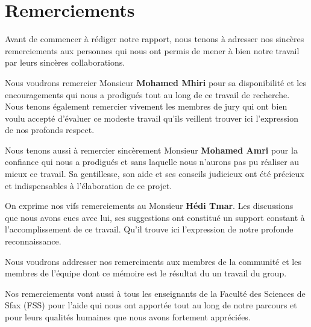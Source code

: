 \section*{Remerciements}

\vspace{0.9in}
\begin{center}

    Avant de commencer à rédiger notre rapport, nous tenons à adresser nos
    sincères remerciements aux personnes qui nous ont permis de mener à bien
    notre travail par leurs sincères collaborations.

    Nous voudrons remercier Monsieur \textbf{Mohamed Mhiri} pour sa
    disponibilité et les encouragements qui nous a prodigués tout au long de ce
    travail de recherche. Nous tenons également remercier vivement les membres
    de jury qui ont bien voulu accepté d'évaluer ce modeste travail qu'ils
    veillent trouver ici l'expression de nos profonds respect.

    Nous tenons aussi à remercier sincèrement Monsieur \textbf{Mohamed Amri}
    pour la confiance qui nous a prodigués et sans laquelle nous n’aurons pas
    pu réaliser au mieux ce travail. Sa gentillesse, son aide et ses conseils
    judicieux ont été précieux et indispensables à l’élaboration de ce projet.

    On exprime nos vifs remerciements au Monsieur \textbf{Hédi Tmar}. Les
    discussions que nous avons eues avec lui, ses suggestions ont constitué un
    support constant à l’accomplissement de ce travail. Qu'il trouve ici
    l'expression de notre profonde reconnaissance.

    Nous voudrons addresser nos remerciments aux membres de la communité
    \textbf{} et les membres de l'équipe
    \textbf{} dont ce mémoire est le résultat du un
    travail du group.

    Nos remerciements vont aussi à tous les enseignants de la Faculté des
    Sciences de Sfax (FSS) pour l’aide qui nous ont apportée tout au long de
    notre parcours et pour leurs qualités humaines que nous avons fortement
    appréciées.
\end{center}
